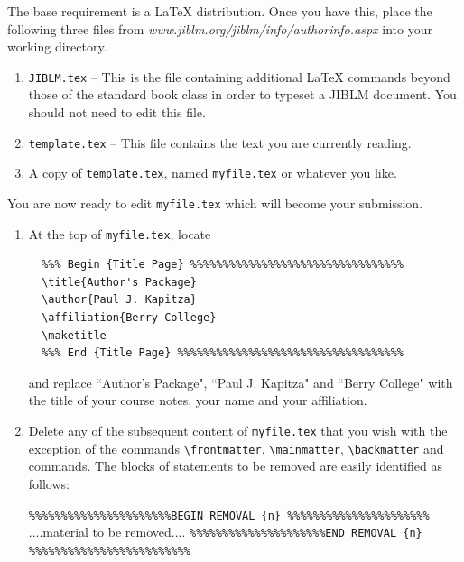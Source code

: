 The base requirement is  a \LaTeX{} distribution. Once you have this, place the following
three files from \emph{www.jiblm.org/jiblm/info/authorinfo.aspx} into your working directory.

\begin{enumerate}
 \item \texttt{JIBLM.tex} -- This is the file containing additional \LaTeX{} commands
       beyond those of the standard book class in order to typeset a JIBLM document.  You should not need
       to edit this file.
 \item \texttt{template.tex} -- This file contains the text you are currently reading.
 \item A copy of \texttt{template.tex}, named \texttt{myfile.tex} or whatever you like.
\end{enumerate}

\noindent
You are now ready to edit \texttt{myfile.tex} which will become your submission.

\begin{enumerate}

 \item At the top of \texttt{myfile.tex}, locate
       \begin{verbatim}
  %%% Begin {Title Page} %%%%%%%%%%%%%%%%%%%%%%%%%%%%%%%%%
  \title{Author's Package}
  \author{Paul J. Kapitza}
  \affiliation{Berry College}
  \maketitle
  %%% End {Title Page} %%%%%%%%%%%%%%%%%%%%%%%%%%%%%%%%%%%
 \end{verbatim}
 and replace ``Author's Package", ``Paul J. Kapitza" and ``Berry
 College" with the title of your course notes, your name and your
 affiliation.

 \item Delete any of the subsequent content of \texttt{myfile.tex} that you wish with
       the exception of the commands \verb|\frontmatter|,
       \verb|\mainmatter|, \verb|\backmatter| and
       \verb|| commands. The blocks of statements
       to be removed are easily identified as follows:
       \begin{center}
        \verb|%%%%%%%%%%%%%%%%%%%%%%BEGIN REMOVAL {n} %%%%%%%%%%%%%%%%%%%%%%|
        ....material to be removed....
        \verb|%%%%%%%%%%%%%%%%%%%%%END REMOVAL {n} %%%%%%%%%%%%%%%%%%%%%%%%%|
       \end{center}

\end{enumerate}


